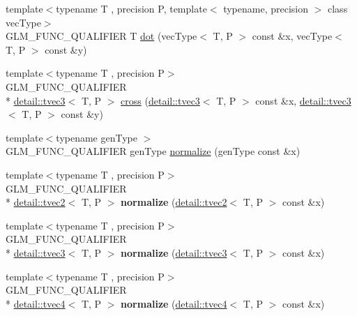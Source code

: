 \begin{DoxyCompactItemize}
\item 
{\footnotesize template$<$typename T , precision P, template$<$ typename, precision $>$ class vec\-Type$>$ }\\G\-L\-M\-\_\-\-F\-U\-N\-C\-\_\-\-Q\-U\-A\-L\-I\-F\-I\-E\-R T \hyperlink{group__core__func__geometric_ga7dada304da2ba7dd3376ab4f178c3f6b}{dot} (vec\-Type$<$ T, P $>$ const \&x, vec\-Type$<$ T, P $>$ const \&y)
\item 
{\footnotesize template$<$typename T , precision P$>$ }\\G\-L\-M\-\_\-\-F\-U\-N\-C\-\_\-\-Q\-U\-A\-L\-I\-F\-I\-E\-R \\*
\hyperlink{structglm_1_1detail_1_1tvec3}{detail\-::tvec3}$<$ T, P $>$ \hyperlink{group__core__func__geometric_ga89b91c2a256cfb62ecbc589d1ee36d3c}{cross} (\hyperlink{structglm_1_1detail_1_1tvec3}{detail\-::tvec3}$<$ T, P $>$ const \&x, \hyperlink{structglm_1_1detail_1_1tvec3}{detail\-::tvec3}$<$ T, P $>$ const \&y)
\item 
{\footnotesize template$<$typename gen\-Type $>$ }\\G\-L\-M\-\_\-\-F\-U\-N\-C\-\_\-\-Q\-U\-A\-L\-I\-F\-I\-E\-R gen\-Type \hyperlink{group__core__func__geometric_ga15aa87101457e41663b08a8dcc3357f8}{normalize} (gen\-Type const \&x)
\item 
\hypertarget{namespaceglm_a3cdf867b5e7051372a7d4ba81fbf830c}{{\footnotesize template$<$typename T , precision P$>$ }\\G\-L\-M\-\_\-\-F\-U\-N\-C\-\_\-\-Q\-U\-A\-L\-I\-F\-I\-E\-R \\*
\hyperlink{structglm_1_1detail_1_1tvec2}{detail\-::tvec2}$<$ T, P $>$ {\bfseries normalize} (\hyperlink{structglm_1_1detail_1_1tvec2}{detail\-::tvec2}$<$ T, P $>$ const \&x)}\label{namespaceglm_a3cdf867b5e7051372a7d4ba81fbf830c}

\item 
\hypertarget{namespaceglm_af238550c4974c61571d5021d1b5f94fe}{{\footnotesize template$<$typename T , precision P$>$ }\\G\-L\-M\-\_\-\-F\-U\-N\-C\-\_\-\-Q\-U\-A\-L\-I\-F\-I\-E\-R \\*
\hyperlink{structglm_1_1detail_1_1tvec3}{detail\-::tvec3}$<$ T, P $>$ {\bfseries normalize} (\hyperlink{structglm_1_1detail_1_1tvec3}{detail\-::tvec3}$<$ T, P $>$ const \&x)}\label{namespaceglm_af238550c4974c61571d5021d1b5f94fe}

\item 
\hypertarget{namespaceglm_a7ef6210f95347aa9bf898b789821dcdf}{{\footnotesize template$<$typename T , precision P$>$ }\\G\-L\-M\-\_\-\-F\-U\-N\-C\-\_\-\-Q\-U\-A\-L\-I\-F\-I\-E\-R \\*
\hyperlink{structglm_1_1detail_1_1tvec4}{detail\-::tvec4}$<$ T, P $>$ {\bfseries normalize} (\hyperlink{structglm_1_1detail_1_1tvec4}{detail\-::tvec4}$<$ T, P $>$ const \&x)}\label{namespaceglm_a7ef6210f95347aa9bf898b789821dcdf}


\end{DoxyCompactItemize}
